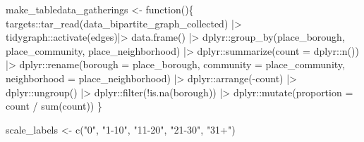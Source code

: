 \documentclass[
  letterpaper,
  DIV=11,
  numbers=noendperiod,
  oneside]{scrreprt}
\newenvironment{Shaded}{\begin{snugshade}}{\end{snugshade}}
\newcommand{\AttributeTok}[1]{\textcolor[rgb]{0.40,0.45,0.13}{#1}}
\newcommand{\ControlFlowTok}[1]{\textcolor[rgb]{0.00,0.23,0.31}{#1}}
\newcommand{\FunctionTok}[1]{\textcolor[rgb]{0.28,0.35,0.67}{#1}}
\newcommand{\NormalTok}[1]{\textcolor[rgb]{0.00,0.23,0.31}{#1}}
\newcommand{\OtherTok}[1]{\textcolor[rgb]{0.00,0.23,0.31}{#1}}
\newcommand{\SpecialCharTok}[1]{\textcolor[rgb]{0.37,0.37,0.37}{#1}}
\newcommand{\StringTok}[1]{\textcolor[rgb]{0.13,0.47,0.30}{#1}}
\begin{document}
\begin{Shaded}
\begin{Highlighting}[]
\NormalTok{make\_tabledata\_gatherings }\OtherTok{\textless{}{-}} \ControlFlowTok{function}\NormalTok{()\{}
\NormalTok{  targets}\SpecialCharTok{::}\FunctionTok{tar\_read}\NormalTok{(data\_bipartite\_graph\_collected) }\SpecialCharTok{|\textgreater{}}
\NormalTok{    tidygraph}\SpecialCharTok{::}\FunctionTok{activate}\NormalTok{(edges)}\SpecialCharTok{|\textgreater{}}
    \FunctionTok{data.frame}\NormalTok{() }\SpecialCharTok{|\textgreater{}}
\NormalTok{    dplyr}\SpecialCharTok{::}\FunctionTok{group\_by}\NormalTok{(place\_borough, place\_community, place\_neighborhood) }\SpecialCharTok{|\textgreater{}}
\NormalTok{    dplyr}\SpecialCharTok{::}\FunctionTok{summarize}\NormalTok{(}\AttributeTok{count =}\NormalTok{ dplyr}\SpecialCharTok{::}\FunctionTok{n}\NormalTok{()) }\SpecialCharTok{|\textgreater{}}
\NormalTok{    dplyr}\SpecialCharTok{::}\FunctionTok{rename}\NormalTok{(}\AttributeTok{borough =}\NormalTok{ place\_borough, }\AttributeTok{community =}\NormalTok{ place\_community, }\AttributeTok{neighborhood =}\NormalTok{ place\_neighborhood) }\SpecialCharTok{|\textgreater{}}
\NormalTok{    dplyr}\SpecialCharTok{::}\FunctionTok{arrange}\NormalTok{(}\SpecialCharTok{{-}}\NormalTok{count) }\SpecialCharTok{|\textgreater{}}
\NormalTok{    dplyr}\SpecialCharTok{::}\FunctionTok{ungroup}\NormalTok{() }\SpecialCharTok{|\textgreater{}}
\NormalTok{    dplyr}\SpecialCharTok{::}\FunctionTok{filter}\NormalTok{(}\SpecialCharTok{!}\FunctionTok{is.na}\NormalTok{(borough)) }\SpecialCharTok{|\textgreater{}}
\NormalTok{    dplyr}\SpecialCharTok{::}\FunctionTok{mutate}\NormalTok{(}\AttributeTok{proportion =}\NormalTok{ count }\SpecialCharTok{/} \FunctionTok{sum}\NormalTok{(count))}
\NormalTok{\}}


\NormalTok{scale\_labels }\OtherTok{\textless{}{-}} \FunctionTok{c}\NormalTok{(}\StringTok{"0"}\NormalTok{, }\StringTok{"1{-}10"}\NormalTok{, }\StringTok{"11{-}20"}\NormalTok{, }\StringTok{"21{-}30"}\NormalTok{, }\StringTok{"31+"}\NormalTok{)}


\end{Highlighting}
\end{Shaded}
\end{document}

